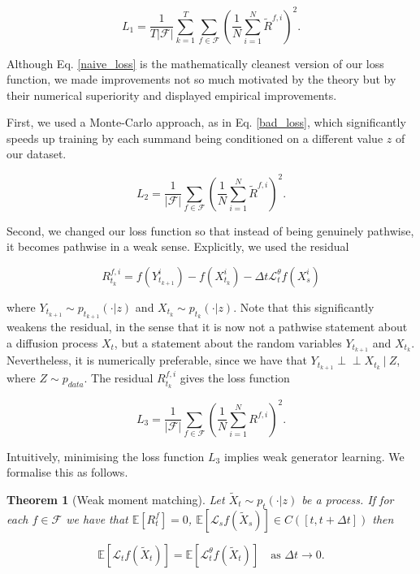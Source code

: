 \documentclass[12pt]{article}
\theoremstyle{break}
\newtheorem{theorem}{Theorem}[section]
\newcommand{\indep}{\perp \!\!\! \perp}
\begin{document}
\begin{equation}
	\label{naive_loss}
	L_1 = \frac{1}{T|\mathcal{F}|} \sum_{k=1}^{T} \sum_{f \in \mathcal{F}} \left(\frac{1}{N}\sum_{i=1}^{N} \tilde R^{f, i}\right)^2.
\end{equation}


Although Eq. \ref{naive_loss} is the mathematically cleanest version of our loss function, we made improvements not so much motivated by the theory but by their numerical superiority and displayed empirical improvements. 

First, we used a Monte-Carlo approach, as in Eq. \ref{bad_loss}, which significantly speeds up training by each summand being conditioned on a different value $z$ of our dataset.

\begin{equation}
	\label{bad_loss}
	L_2 = \frac{1}{|\mathcal{F}|} \sum_{f \in \mathcal{F}} \left(\frac{1}{N}\sum_{i=1}^{N} \tilde R^{f, i}\right)^2.
\end{equation}

Second, we changed our loss function so that instead of being genuinely pathwise, it becomes pathwise in a weak sense. Explicitly, we used the residual

\begin{equation}
	R_{t_k}^{f,i} = f(Y_{t_{k+1}}^i) - f(X_{t_k}^i) - \Delta t \mathcal{L}_t^\theta f(X_s^i)
\end{equation}

where $Y_{t_{k+1}} \sim p_{t_{k+1}}(\cdot|z)$ and $X_{t_k} \sim p_{t_k}(\cdot|z)$. Note that this significantly weakens the residual, in the sense that it is now not a pathwise statement about a diffusion process $X_t$, but a statement about the random variables $Y_{t_{k+1}}$ and $X_{t_k}$. Nevertheless, it is numerically preferable, since we have that $Y_{t_{k+1}} \indep X_{t_k} \ | \ Z$, where $Z \sim p_{data}$. The residual $R_{t_k}^{f, i}$ gives the loss function

\begin{equation}
	\label{better_loss}
	L_3 = \frac{1}{|\mathcal{F}|} \sum_{f \in \mathcal{F}} \left(\frac{1}{N}\sum_{i=1}^{N} R^{f, i}\right)^2.
\end{equation}

Intuitively, minimising the loss function $L_3$ implies weak generator learning. We formalise this as follows.

\begin{theorem}[Weak moment matching]
	Let $\tilde X_t \sim p_t(\cdot|z)$ be a process. If for each $f \in \mathcal{F}$ we have that $\mathbb{E}[R^f_t] = 0$, $\mathbb{E}[\mathcal{L}_sf(\tilde X_s)] \in C([t,t+\Delta t])$ then 

\begin{equation}
	\mathbb{E}[\mathcal{L}_t f(\tilde X_t)] = \mathbb{E}[\mathcal{L}_t^\theta f(\tilde X_t)] \quad \text{as } \Delta t \to 0.
\end{equation}
\end{theorem}
\end{document}
